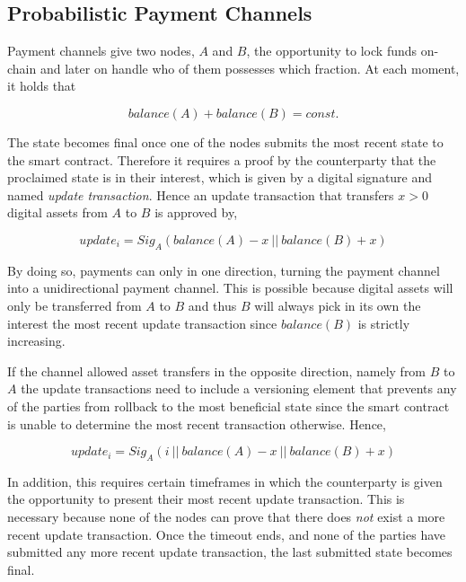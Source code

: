 \subsection{Probabilistic Payment Channels}
\label{sec:incentives:probabilistic}

Payment channels give two nodes, $A$ and $B$, the opportunity to lock funds on-chain and later on handle who of them possesses which fraction. At each moment, it holds that

$$ balance(A) + balance(B) = const. $$

The state becomes final once one of the nodes submits the most recent state to the smart contract. Therefore it requires a proof by the counterparty that the proclaimed state is in their interest, which is given by a digital signature and named \textit{update transaction}. Hence an update transaction that transfers $x > 0$ digital assets from $A$ to $B$ is approved by,

$$ update_i = Sig_A (balance(A) - x \ || \ balance(B) + x) $$

By doing so, payments can only in one direction, turning the payment channel into a unidirectional payment channel. This is possible because digital assets will only be transferred from $A$ to $B$ and thus $B$ will always pick in its own the interest the most recent update transaction since $balance(B)$ is strictly increasing.

If the channel allowed asset transfers in the opposite direction, namely from $B$ to $A$ the update transactions need to include a versioning element that prevents any of the parties from rollback to the most beneficial state since the smart contract is unable to determine the most recent transaction otherwise. Hence,

$$ update_i = Sig_A (i \ || \ balance(A) - x \ || \ balance(B) + x) $$

In addition, this requires certain timeframes in which the counterparty is given the opportunity to present their most recent update transaction. This is necessary because none of the nodes can prove that there does \textit{not} exist a more recent update transaction. Once the timeout ends, and none of the parties have submitted any more recent update transaction, the last submitted state becomes final.

